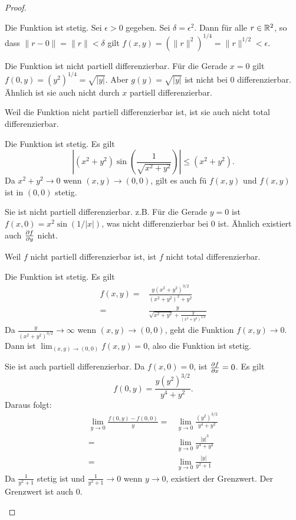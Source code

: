 \begin{proof}
	\begin{parts}
	\item Die Funktion ist stetig. Sei $\epsilon>0$ gegeben. Sei $\delta=\epsilon^2$. Dann f\"{u}r alle $r\in \mathbb{R}^2$, so dass $\|r-0\|=\|r\|<\delta$ gilt $f(x,y)=(\|r\|^2)^{1 / 4}=\|r\|^{1 / 2}<\epsilon$.

		Die Funktion ist nicht partiell differenzierbar. F\"{u}r die Gerade $x=0$ gilt $f(0,y)=(y^2)^{1 / 4}=\sqrt{|y|} $. Aber $g(y)=\sqrt{|y|} $ ist nicht bei $0$ differenzierbar. Ähnlich ist sie auch nicht durch $x$ partiell differenzierbar.

		Weil die Funktion nicht partiell differenzierbar ist, ist sie auch nicht total differenzierbar.
	\item Die Funktion ist stetig. Es gilt
		\[
		\left|(x^2+y^2)\sin\left( \frac{1}{\sqrt{x^2+y^2} } \right)  \right| \le (x^2+y^2)
	.\]
	Da $x^2+y^2\to 0$ wenn $(x,y)\to (0,0)$, gilt es auch f\"{u} $f(x,y)$ und $f(x,y)$ ist in $(0,0)$ stetig.

	Sie ist nicht partiell differenzierbar. z.B. F\"{u}r die Gerade $y=0$ ist $f(x,0)=x^2 \sin(1 / |x|)$, was nicht differenzierbar bei $0$ ist. Ähnlich existiert auch $\pdv{f}{y}(0,0)$ nicht. 

	Weil $f$ nicht partiell differenzierbar ist, ist $f$ nicht total differenzierbar.
\item Die Funktion ist stetig. Es gilt
	\begin{align*}
		f(x,y)=& \frac{y(x^2+y^2)^{3 / 2}}{(x^2+y^2)^2+y^2}\\
		=&\frac{y}{\sqrt{x^2+y^2} +\frac{y}{(x^2+y^2)^{3 / 2}}}
	\end{align*}
	Da $\frac{y}{(x^2+y^2)^{3 / 2} }\to \infty$ wenn $(x,y)\to (0,0)$, geht die Funktion $f(x,y)\to 0$. Dann ist $\lim_{(x,y)\to (0,0)}f(x,y)=0$, also die Funktion ist stetig.

	Sie ist auch partiell differenzierbar. Da $f(x,0)=0$, ist $\pdv{f}{x}(0,0)=0$. Es gilt
	\[
		f(0,y)=\frac{y(y^2)^{3 / 2}}{y^4+y^2}
	.\] 
	Daraus folgt:
	\begin{align*}
		\lim_{y \to 0} \frac{f(0,y)-f(0,0)}{y}=&\lim_{y \to 0}  \frac{(y^2)^{3 / 2}}{y^4+y^2}\\
		=&\lim_{y \to 0} \frac{|y|^{3}}{y^4+y^2}\\
		=&\lim_{y \to 0} \frac{|y|}{y^2+1} 
	\end{align*}
	Da $\frac{1}{y^2+1}$ stetig ist und $\frac{1}{y^2+1}\to 0$ wenn $y\to 0$, existiert der Grenzwert. Der Grenzwert ist auch $0$. 


\end{parts}
\end{proof}
